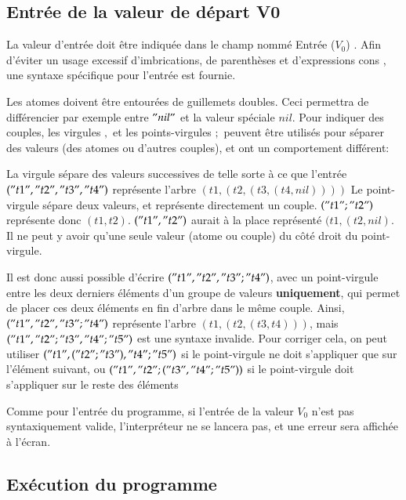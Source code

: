 \documentclass{article}
\begin{document}
\subsection{Entrée de la valeur de départ V0}

La valeur d'entrée doit être indiquée dans le champ nommé \og Entrée ($V_0$) \fg{}. Afin d'éviter un usage excessif d'imbrications, de parenthèses et d'expressions \og cons \fg{}, une syntaxe spécifique pour l'entrée est fournie.

Les atomes doivent être entourées de guillemets doubles. Ceci permettra de différencier par exemple entre $"nil"$ et la valeur spéciale $nil$. Pour indiquer des couples, les virgules $,$ et les points-virgules $;$ peuvent être utilisés pour séparer des valeurs (des atomes ou d'autres couples), et ont un comportement différent:
\newline

La virgule sépare des valeurs successives de telle sorte à ce que l'entrée $("t1", "t2", "t3", "t4")$ représente l'arbre $(t1, (t2, (t3, (t4, nil))))$
Le point-virgule sépare deux valeurs, et représente directement un couple. $("t1"; "t2")$ représente donc $(t1, t2)$. $("t1", "t2")$ aurait à la place représenté $(t1, (t2, nil)$. Il ne peut y avoir qu'une seule valeur (atome ou couple) du côté droit du point-virgule.
\newline

Il est donc aussi possible d'écrire $("t1", "t2", "t3"; "t4")$, avec un point-virgule entre les deux derniers éléments d'un groupe de valeurs \textbf{uniquement}, qui permet de placer ces deux éléments en fin d'arbre dans le même couple. Ainsi, $("t1", "t2", "t3"; "t4")$ représente l'arbre $(t1, (t2, (t3, t4)))$, mais $("t1", "t2"; "t3", "t4"; "t5")$ est une syntaxe invalide. Pour corriger cela, on peut utiliser $("t1", ("t2"; "t3"), "t4"; "t5")$ si le point-virgule ne doit s'appliquer que sur l'élément suivant,  ou $("t1", "t2"; ("t3", "t4"; "t5"))$ si le point-virgule doit s'appliquer sur le reste des éléments
\newline

Comme pour l'entrée du programme, si l'entrée de la valeur $V_0$ n'est pas syntaxiquement valide, l'interpréteur ne se lancera pas, et une erreur sera affichée à l'écran.


\subsection{Exécution du programme}
\end{document}
